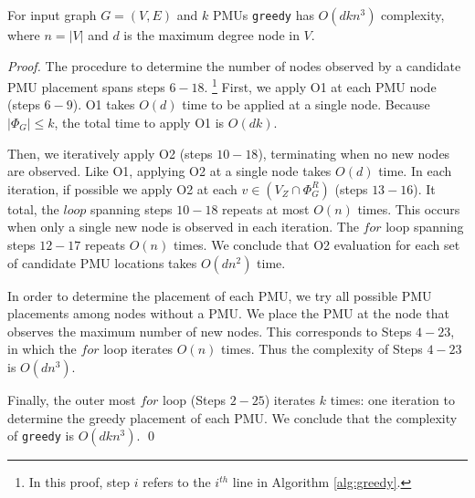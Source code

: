 \begin{theorem}
For input graph $G=(V,E)$ and $k$ PMUs {\tt greedy} has $O(dkn^3)$ complexity, where $n=|V|$ and $d$ is the maximum degree node in $V$.
\label{thm:greedy-complex}
\end{theorem}
\begin{proof}
The procedure to determine the number of nodes observed by a candidate PMU placement spans steps $6 - 18$.
{\footnote {\small In this proof, step $i$ refers to the $i^{th}$ line  in Algorithm \ref{alg:greedy}.}}
First, we apply O1 at each PMU node (steps $6 -9$). O1 takes $O(d)$ time 
to be applied at a single node.  Because $|\Phi_G| \leq k$, the total time to apply O1 is $O(dk)$. 

Then, we iteratively apply O2 (steps $10-18$), terminating when no new nodes are observed.  Like O1, applying O2 at a single node takes $O(d)$ time. 
In each iteration, if possible we apply O2 at each $v \in (V_Z \cap \Phi_G^R)$ (steps $13-16$). %
It total, the $loop$ spanning steps $10-18$ repeats at most $O(n)$ times.  This occurs when only a single new node is observed in each iteration.  The $for$ loop spanning steps $12-17$
repeats $O(n)$ times. We conclude that O2 evaluation for each set of candidate PMU locations takes $O(dn^2)$ time.

In order to determine the placement of each PMU, we try all possible PMU placements among nodes without a PMU. We place the PMU at the node that observes the maximum number of new nodes.  This 
corresponds to Steps $4-23$, in which the $for$ loop iterates $O(n)$ times. 
Thus the complexity of Steps $4-23$ is $O(dn^3)$. 

Finally, the outer most $for$ loop (Steps $2-25$) iterates $k$ times: one iteration
to determine the greedy placement of each PMU.  We conclude that the complexity of {\tt greedy} is $O(dkn^3)$. \qed
\end{proof}





